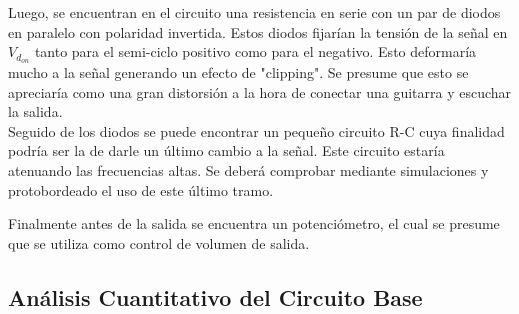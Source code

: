 Luego, se encuentran en el circuito una resistencia en serie con un par de diodos en paralelo con polaridad invertida. Estos diodos fijarían la tensión de la señal en $V_{d_{on}}$ tanto para el semi-ciclo positivo como para el negativo. Esto deformaría mucho a la señal generando un efecto de "clipping". Se presume que esto se apreciaría como una gran distorsión a la hora de conectar una guitarra y escuchar la salida.\\

Seguido de los diodos se puede encontrar un pequeño circuito R-C cuya finalidad podría ser la de darle un último cambio a la señal. Este circuito estaría atenuando las frecuencias altas. Se deberá comprobar mediante simulaciones y protobordeado el uso de este último tramo.

Finalmente antes de la salida se encuentra un potenciómetro, el cual se presume que se utiliza como control de volumen de salida.

\subsection{Análisis Cuantitativo del Circuito Base}

